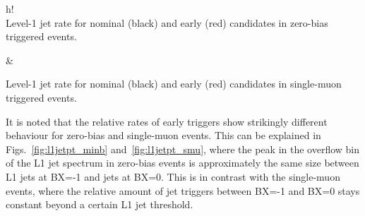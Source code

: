 \documentclass[11pt]{cmspaperpdf}
\begin{document}
\begin{2figures}{h!}
 \\
\caption{Level-1 jet rate for nominal (black) and early (red) candidates in zero-bias triggered  events.}\label{fig:hbherate_minb} &
\caption{Level-1 jet rate for nominal (black) and early (red) candidates in single-muon triggered events.}\label{fig:hbherate_smu}
\end{2figures}

It is noted that the relative rates of early triggers show strikingly different behaviour for zero-bias and single-muon events. This can be explained in Figs.~\ref{fig:l1jetpt_minb} and~\ref{fig:l1jetpt_smu}, where the peak in the overflow bin of the L1 jet spectrum in zero-bias events is approximately the same size between L1 jets at BX=-1 and jets at BX=0. This is in contrast with the single-muon events, where the relative amount of jet triggers between BX=-1 and BX=0 stays constant beyond a certain L1 jet threshold.
\end{document}
